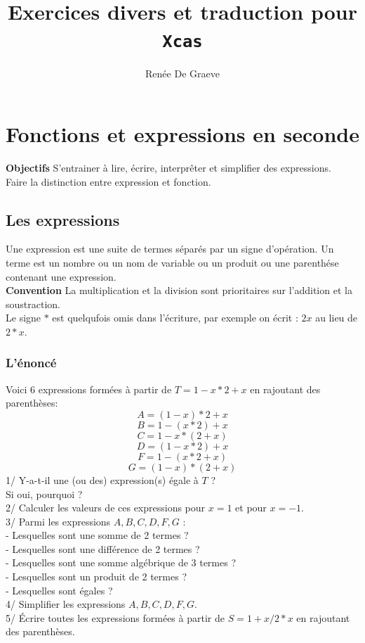 \documentclass[a4paper,11pt]{book}
\title{Exercices divers  et traduction pour\\ {\tt Xcas}}
\author{Ren\'ee De Graeve}
\begin{document}
\newcommand{\asinh}{\,\,\mbox{asinh\,}}
\newcommand{\acosh}{\,\,\mbox{acosh\,}}
\newcommand{\atanh}{\,\,\mbox{atanh\,}}
\newcommand{\acos}{\,\,\mbox{acos\,}}
\newcommand{\asin}{\,\,\mbox{asin\,}}

\maketitle

\chapter{Fonctions et expressions en seconde}
{\bf Objectifs}
S'entrainer \`a lire, \'ecrire, interpr\^eter et simplifier des 
expressions.\\
Faire la distinction entre expression et fonction. 
\section{Les expressions}
Une expression est une suite de termes s\'epar\'es par un signe 
d'op\'eration.
Un terme est un nombre ou un nom de variable ou un
produit ou  une parenth\'ese contenant une expression.\\
{\bf Convention}
La multiplication et la division sont prioritaires sur l'addition et la
soustraction.\\
Le signe $*$ est quelqufois omis dans l'\'ecriture, par exemple on 
\'ecrit :
$2x$ au lieu de $2*x$. 

\subsection{L'\'enonc\'e}
Voici 6 expressions form\'ees \`a partir de $T=1-x*2+x$ en rajoutant des 
parenth\`eses:\\
$$A=(1-x)*2+x$$
$$B=1-(x*2)+x$$
$$C=1-x*(2+x)$$
$$D=(1-x*2)+x$$
$$F=1-(x*2+x)$$
$$G=(1-x)*(2+x)$$
1/ Y-a-t-il une (ou des) expression(s) \'egale \`a $T$ ?\\
Si oui, pourquoi ?\\
2/ Calculer les valeurs de ces expressions pour $x=1$ et pour $x=-1$.\\
3/ Parmi les expressions $A,B,C,D,F,G$ :\\  
- Lesquelles sont une somme de 2 termes ?\\  
- Lesquelles sont une diff\'erence de 2 termes ? \\ 
- Lesquelles sont une somme alg\'ebrique de 3 termes ?\\  
- Lesquelles sont un produit de 2 termes ?\\ 
- Lesquelles sont \'egales ?\\
4/ Simplifier les expressions $A,B,C,D,F,G$.\\
5/ \'Ecrire toutes les  expressions form\'ees \`a partir de $S=1+x/2*x$ en 
rajoutant des parenth\`eses.
\end{document}
